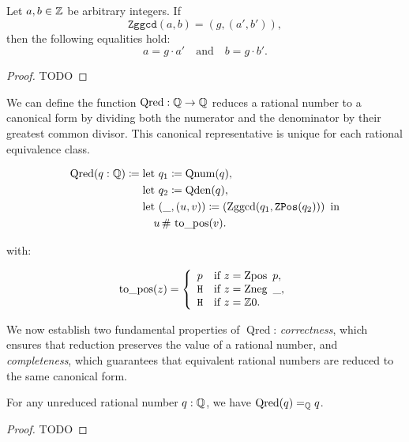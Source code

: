 \begin{lemma}
Let $a, b \in \mathbb{Z}$ be arbitrary integers. If 
\[
\texttt{Zggcd}(a, b) = (g, (a', b')),
\]
then the following equalities hold:
\[
a = g \cdot a' \quad \text{and} \quad b = g \cdot b'.
\]
\begin{proof}
TODO
\end{proof}
\end{lemma}

We can define the function  $\operatorname{Qred} :\mathbb{Q} \rightarrow \mathbb{Q}$  reduces a rational number to a canonical form by dividing both the numerator and the denominator by their greatest common divisor.
This canonical representative is unique for each rational equivalence class.

\begin{definition}[Qred]
\[
\operatorname{Qred}(q : \mathbb{Q}) \coloneqq 
\begin{aligned}[t]
  &\text{let } q_1 \coloneqq \operatorname{Qnum}(q), \\
  &\text{let } q_2 \coloneqq \operatorname{Qden}(q), \\
  &\text{let } (\_,(u,v)) \coloneqq \left( \operatorname{Zggcd}(q_1, \mathop{\texttt{ZPos}}(q_2)) \right) \text{ in} \\
  &\quad u \,\#\, \operatorname{to\_pos}(v).
\end{aligned}
\]

with:

\[
\operatorname{to\_pos}(z) = 
\left\{
\begin{array}{ll}
p & \text{if } z = \operatorname{Zpos}~p, \\
\texttt{H} & \text{if } z = \operatorname{Zneg}~\_, \\
\texttt{H} & \text{if } z = \mathbb{Z}0.
\end{array}
\right.
\]
\end{definition}

We now establish two fundamental properties of $\operatorname{Qred}$: \emph{correctness}, which ensures that reduction preserves the value of a rational number,
and \emph{completeness}, which guarantees that equivalent rational numbers are reduced to the same canonical form.

\begin{lemma}
For any unreduced rational number $q: \mathbb{Q}$, we have $\operatorname{Qred}(q) =_{\mathbb{Q}} q$.
\begin{proof}
TODO
\end{proof}
\end{lemma}

